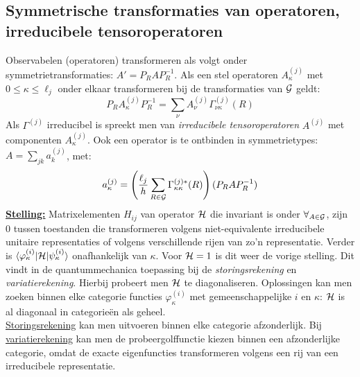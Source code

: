 \documentclass[twoside]{report}
\begin{document}
\subsection{Symmetrische transformaties van operatoren, irreducibele tensoroperatoren}
Observabelen (operatoren) transformeren als volgt onder symmetrietransformaties:
$A'=P_RAP_R^{-1}$. Als een stel operatoren $A^{(j)}_{\kappa}$ met $0\leq\kappa\leq\ell_j$
onder elkaar transformeren bij de transformaties van ${\cal{G}}$ geldt:
\[
P_RA_{\kappa}^{(j)}P_R^{-1}=\sum_{\nu}A_{\nu}^{(j)}\Gamma^{(j)}_{\nu\kappa}(R)
\]
Als $\Gamma^{(j)}$ irreducibel is spreekt men van {\it irreducibele
tensoroperatoren} $A^{(j)}$ met componenten $A^{(j)}_{\kappa}$.
\npar
Ook een operator is te ontbinden in symmetrietypes: $A=\sum\limits_{jk}a^{(j)}_k$,
met:
\[
a^{(j)}_{\kappa}=\left(\frac{\ell_j}{h}\sum_{R\in{\cal{G}}}\Gamma^{(j)*}_{\kappa\kappa}(R)\right)(P_RAP_R^{-1})
\]
\underline{\bf Stelling:} Matrixelementen $H_{ij}$ van operator ${\cal{H}}$ die
invariant is onder $\forall_{A\in{\cal{G}}}$, zijn 0 tussen toestanden die
transformeren volgens niet-equivalente irreducibele unitaire representaties
of volgens verschillende rijen van zo'n representatie. Verder is
$\langle\varphi^{(i)}_{\kappa}|{\cal{H}}|\psi^{(i)}_{\kappa}\rangle$ onafhankelijk
van $\kappa$. Voor ${\cal{H}}=1$ is dit weer de vorige stelling.
\npar
Dit vindt in de quantummechanica toepassing bij de {\it storingsrekening} en
{\it variatierekening}. Hierbij probeert men ${\cal{H}}$ te diagonaliseren. Oplossingen
kan men zoeken binnen elke categorie functies $\varphi^{(i)}_{\kappa}$ met
gemeenschappelijke $i$ en $\kappa$: ${\cal{H}}$ is al diagonaal in categorie\"en
als geheel.\\
\underline{Storingsrekening} kan men uitvoeren binnen elke categorie
afzonderlijk. Bij \underline{variatierekening} kan men de probeergolffunctie
kiezen binnen een afzonderlijke categorie, omdat de exacte eigenfuncties
transformeren volgens een rij van een irreducibele representatie.
\end{document}
